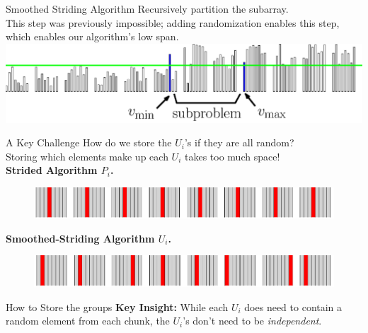 \documentclass[table,serif,mathserif,final]{beamer}
\theoremstyle{remark}
\begin{document}
\begin{frame}{}
\begin{columns}[t]
\begin{column}{0.295\linewidth}
\begin{block}{\Huge Smoothed Striding Algorithm}
	Recursively partition the subarray.\\
  {\color{blue}This step was previously impossible; adding randomization enables this step, which enables our algorithm's low span. }
	\includegraphics[width=\linewidth]{imgs/smoothedStridingAlgSim/sim45.eps}
\end{block}

\vspace{0.5cm}
\begin{block}{\Huge A Key Challenge}
  \Huge
How do we store the $U_i$'s if they are all random?	\\
\vspace{0.5cm}
Storing which elements make up each $U_i$ takes too much space!\\

\vspace{0.5cm}
\textbf{Strided Algorithm $P_i$.}
\begin{figure}
	\includegraphics[width=\linewidth]{imgs/stridedAlgHighlighted.png}
\end{figure}
\textbf{Smoothed-Striding Algorithm $U_i$.}
\begin{figure}
	\includegraphics[width=\linewidth]{imgs/smoothedStridingAlgHighlighted.png}
\end{figure}
\end{block}

\vspace{0.5cm}
\begin{block}{\Huge How to Store the groups}
  \Huge
	\textbf{Key Insight:} While each $U_i$ does need to contain a random element from each chunk, the $U_i$'s don't need to be \emph{independent}.


\end{block}
\end{column}
\end{columns}
\end{frame}
\end{document}
